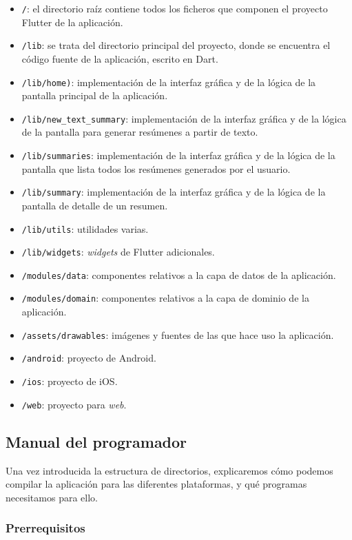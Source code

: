 \vspace{-0.2cm}
\begin{itemize} [\textbullet]
	\tightlist
	\item \texttt{/}: el directorio raíz contiene todos los ficheros que componen el proyecto Flutter de la aplicación.
	\item \texttt{/lib}: se trata del directorio principal del proyecto, donde se encuentra el código fuente de la aplicación, escrito en Dart.
	\item \texttt{/lib/home)}: implementación de la interfaz gráfica y de la lógica de la pantalla principal de la aplicación.
	\item \texttt{/lib/new\_text\_summary}: implementación de la interfaz gráfica y de la lógica de la pantalla para generar resúmenes a partir de texto.
	\item \texttt{/lib/summaries}: implementación de la interfaz gráfica y de la lógica de la pantalla que lista todos los resúmenes generados por el usuario.
	\item \texttt{/lib/summary}: implementación de la interfaz gráfica y de la lógica  de la pantalla de detalle de un resumen.
	\item \texttt{/lib/utils}: utilidades varias.
	\item \texttt{/lib/widgets}: \emph{widgets} de Flutter adicionales.
	\item \texttt{/modules/data}: componentes relativos a la capa de datos de la aplicación.
	\item \texttt{/modules/domain}: componentes relativos a la capa de dominio de la aplicación.
	\item \texttt{/assets/drawables}: imágenes y fuentes de las que hace uso la aplicación.
	\item \texttt{/android}: proyecto de Android.
	\item \texttt{/ios}: proyecto de iOS.
	\item \texttt{/web}: proyecto para \emph{web}.
\end{itemize}


\subsection{Manual del programador}

Una vez introducida la estructura de directorios, explicaremos cómo podemos compilar la aplicación para las diferentes plataformas, y qué programas necesitamos para ello.

\subsubsection{Prerrequisitos}

